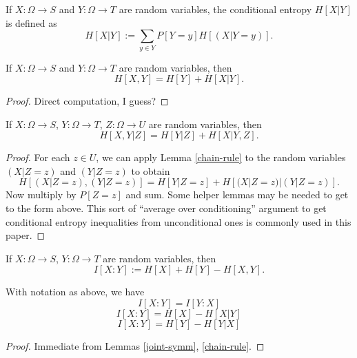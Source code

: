 \begin{definition}\label{conditional-entropy-def}
    If $X: \Omega \to S$ and $Y: \Omega \to T$ are random variables, the conditional entropy $H[X|Y]$ is defined as
  $$ H[X|Y] := \sum_{y \in Y} P[Y = y] H[(X | Y=y)].$$
\end{definition}

\begin{lemma}\label{chain-rule}
  If $X: \Omega \to S$ and $Y: \Omega \to T$ are random variables, then
  $$ H[ X,Y  ] = H[Y] + H[X|Y].$$
\end{lemma}

\begin{proof} Direct computation, I guess?
\end{proof}

\begin{lemma}\label{conditional-chain-rule} 
  If $X: \Omega \to S$, $Y: \Omega \to T$, $Z: \Omega \to U$ are random variables, then
$$ H[  X,Y | Z ] = H[Y | Z] + H[X|Y, Z].$$
\end{lemma}

\begin{proof}  For each $z \in U$, we can apply Lemma \ref{chain-rule} to the random variables $(X|Z=z)$ and $(Y|Z=z)$ to obtain
$$ H[ (X|Z=z),(Y|Z=z) ] = H[Y|Z=z] + H[(X|Z=z)|(Y|Z=z)].$$
Now multiply by $P[Z=z]$ and sum.  Some helper lemmas may be needed to get to the form above.  This sort of ``average over conditioning'' argument to get conditional entropy inequalities from unconditional ones is commonly used in this paper.
\end{proof}

\begin{definition}\label{information-def} If $X: \Omega \to S$, $Y: \Omega \to T$ are random variables, then
  $$ I[ X : Y ] := H[X] + H[Y] - H[X,Y].$$
\end{definition}

\begin{lemma}\label{alternative-mutual}
  With notation as above, we have
$$  I[X : Y] = I[Y:X]$$
$$  I[X : Y] = H[X] - H[X|Y]$$
$$  I[X : Y] = H[Y] - H[Y|X]$$
\end{lemma}

\begin{proof} Immediate from Lemmas \ref{joint-symm}, \ref{chain-rule}.
\end{proof}

